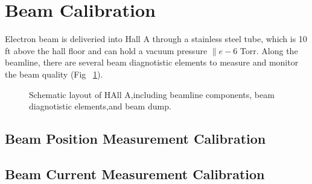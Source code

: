 \section{Beam Calibration}

Electron beam is deliveried into Hall A through a stainless steel tube, which is 10 ft above the hall floor and can hold a vacuum pressure $\|e-6$ Torr. Along the beamline, there are several beam diagnotistic elements to measure and monitor the beam quality (Fig ~\ref{wholehall}).

\begin{figure}[htb]
\centerline{}
\caption[Schematic layout of HAll A,including beamline components, beam diagnotistic elements,and beam dump.]
{\footnotesize{Schematic layout of HAll A,including beamline components, beam diagnotistic elements,and beam dump.}
\label{wholehall}}
\end{figure}


\subsection{Beam Position Measurement Calibration}



\subsection{Beam Current Measurement Calibration}


\clearpage